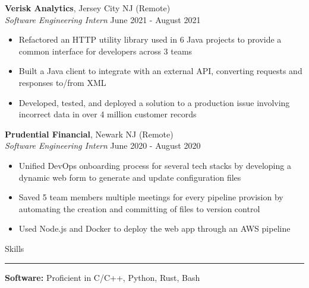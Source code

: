 \documentclass{article}
\newcommand \spacingBetweenHeadings {0.3em}
\newcommand \spacingAfterHeadings {0.5em}
\begin{document}
\noindent
\textbf{Verisk Analytics}, Jersey City NJ (Remote)\\
\textit{Software Engineering Intern}
\hfill
June 2021 - August 2021\\
\vspace{-1em}
\begin{itemize}
\item Refactored an HTTP utility library used in 6 Java projects to provide a common interface for developers across 3 teams
\item Built a Java client to integrate with an external API, converting requests and responses to/from XML
\item Developed, tested, and deployed a solution to a production issue involving incorrect data in over 4 million customer records



\end{itemize}

\noindent
\textbf{Prudential Financial}, Newark NJ (Remote)\\
\textit{Software Engineering Intern}
\hfill
June 2020 - August 2020\\
\vspace{-1em}
\begin{itemize}
\item Unified DevOps onboarding process for several tech stacks by developing a dynamic web form to generate and update configuration files
\item Saved 5 team members multiple meetings for every pipeline provision by automating the creation and committing of files to version control
\item Used Node.js and Docker to deploy the web app through an AWS pipeline
\end{itemize}

\vspace{\spacingBetweenHeadings}

\noindent
\huge Skills\par
\vspace{0.1em}
\hrule
\Large
\vspace{\spacingAfterHeadings}
\noindent
\textbf{Software:} Proficient in C/C++, Python, Rust, Bash
\end{document}
